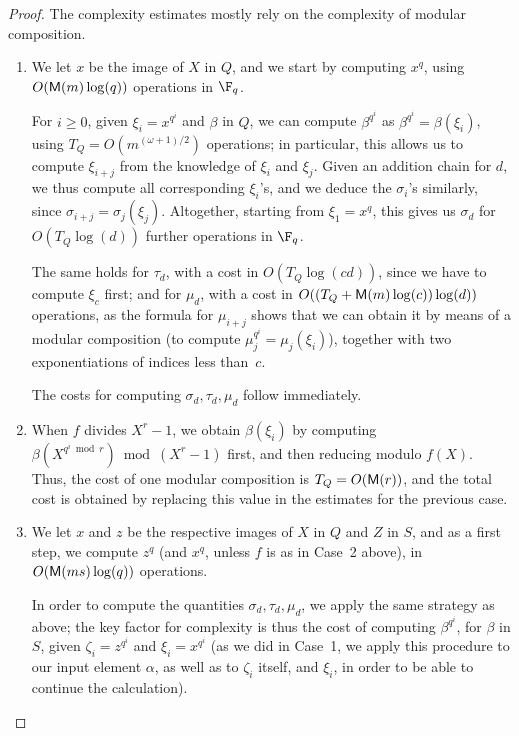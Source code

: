 \begin{proof}
The complexity estimates mostly rely on the complexity of modular composition.
\begin{enumerate}[label=\textbf{Case~\theenumi.},leftmargin=*, align=left]
\item
  We let $x$ be the image of $X$ in $Q$, and we
  start by computing $x^q$, using $O(\mathsf{M}(m)\log(q))$ operations in
  $\F_q$.

  For $i \ge 0$, given $\xi_i = x^{q^i}$ and $\beta$ in $Q$, we can
  compute $\beta^{q^i}$ as $\beta^{q^i}=\beta(\xi_i)$, using
  $T_Q=O(m^{(\omega+1)/2})$ operations; in particular, this allows us to
  compute $\xi_{i+j}$ from the knowledge of $\xi_i$ and $\xi_j$. Given
  an addition chain for $d$, we thus compute all corresponding
  $\xi_i$'s, and we deduce the $\sigma_i$'s similarly, since
  $\sigma_{i+j}=\sigma_j(\xi_j)$. Altogether, starting from
  $\xi_1=x^q$, this gives us $\sigma_d$ for $O(T_Q\log(d))$
  further operations in $\F_q$.

  The same holds for $\tau_d$, with a cost in $O(T_Q\log(cd))$,
  since we have to compute $\xi_c$ first;
  and for $\mu_d$, with a cost in
  $O((T_Q + \mathsf{M}(m)\log(c))\log(d))$ operations,
  as the formula for $\mu_{i+j}$ shows that
  we can obtain it by means of a modular composition
  (to compute $\mu_j^{q^i}=\mu_j(\xi_i)$), together with
  two exponentiations of indices less than~$c$.

  The costs for computing $\sigma_d, \tau_d, \mu_d$ follow immediately.

\item
  When $f$ divides $X^r-1$, we obtain $\beta(\xi_i)$ by computing
  $\beta(X^{q^i \bmod r}) \bmod (X^r-1)$ first, and then reducing
  modulo $f(X)$.  %
  Thus, the cost of one modular composition is $T_Q=O(\mathsf{M}(r))$, and
  the total cost is obtained by replacing this value in the estimates
  for the previous case.

\item
  We let $x$ and $z$ be the respective images of $X$ in $Q$ and $Z$ in $S$,
  and as a first step, we compute $z^q$ (and $x^q$, unless $f$ is as
  in Case~2 above), in $O(\mathsf{M}(ms)\log(q))$ operations.
  
  In order to compute
  the quantities $\sigma_d,\tau_d,\mu_d$, we apply the same strategy
  as above; the key factor for complexity is thus the cost of
  computing $\beta^{q^i}$, for $\beta$ in $S$, given $\zeta_i =
  z^{q^i}$ and $\xi_i=x^{q^i}$ (as we did in Case~1, we apply this
  procedure to our input element $\alpha$, as well as to $\zeta_i$
  itself, and $\xi_i$, in order to be able to continue the
  calculation).


\end{enumerate}
\end{proof}
